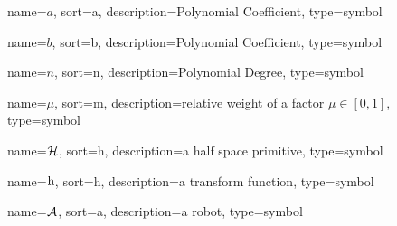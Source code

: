 	{%
		name=\ensuremath{a},
		sort=a,
		description=Polynomial Coefficient,
		type=symbol
	}
	\newcommand{\coefficient}{\gls{sym:coefficient}}

	{%
		name=\ensuremath{b},
		sort=b,
		description=Polynomial Coefficient,
		type=symbol
	}
	\newcommand{\coefficientb}{\gls{sym:coefficientb}}

	{%
		name=\ensuremath{n},
		sort=n,
		description=Polynomial Degree,
		type=symbol
	}
	\newcommand{\poldeg}{\gls{sym:poldeg}}

	{%
		name=\ensuremath{\mu},
		sort=m,
		description=relative weight of a factor \ensuremath{\mu \in [0, 1]},
		type=symbol
	}
	\newcommand{\relweight}{\gls{sym:relweight}}

	{%
		name=\ensuremath{\set{H}},
		sort=h,
		description=a half space primitive,
		type=symbol
	}
	\newcommand{\halfspaceprimitive}{\gls{sym:halfspaceprimitive}}

	{%
		name=\ensuremath{\func{h}},
		sort=h,
		description=a transform function,
		type=symbol
	}
	\newcommand{\transform}{\gls{sym:transform}}

	{%
		name=\ensuremath{\set{A}},
		sort=a,
		description=a robot,
		type=symbol
	}
	\newcommand{\robot}{\gls{sym:robot}}

